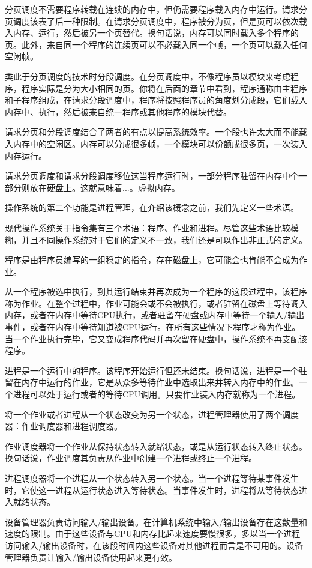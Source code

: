 分页调度不需要程序转载在连续的内存中，但仍需要程序载入内存中运行。请求分页调度该表了后一种限制。在请求分页调度中，程序被分为页，但是页可以依次载入内存、运行，然后被另一个页替代。换句话说，内存可以同时载入多个程序的页。此外，来自同一个程序的连续页可以不必载入同一个帧，一个页可以载入任何空闲帧。

类此于分页调度的技术时分段调度。在分页调度中，不像程序员以模块来考虑程序，程序实际是分为大小相同的页。你将在后面的章节中看到，程序通称由主程序和子程序组成，在请求分段调度中，程序将按照程序员的角度划分成段，它们载入内存中、执行，然后被来自统一程序或其他程序的模块代替。

请求分页和分段调度结合了两者的有点以提高系统效率。一个段也许太大而不能载入内存中的空闲区。内存可以分成很多帧，一个模块可以份额成很多页，一次装入内存运行。

请求分页调度和请求分段调度移位这当程序运行时，一部分程序驻留在内存中个一部分则放在硬盘上。这就意味着...。虚拟内存。

操作系统的第二个功能是进程管理，在介绍该概念之前，我们先定义一些术语。

现代操作系统关于指令集有三个术语：程序、作业和进程。尽管这些术语比较模糊，并且不同操作系统对于它们的定义不一致，我们还是可以作出非正式的定义。

程序是由程序员编写的一组稳定的指令，存在磁盘上，它可能会也肯能不会成为作业。

从一个程序被选中执行，到其运行结束并再次成为一个程序的这段过程中，该程序称为作业。在整个过程中，作业可能会或不会被执行，或者驻留在磁盘上等待调入内存，或者在内存中等待CPU执行，或者驻留在硬盘或内存中等待一个输入/输出事件，或者在内存中等待知道被CPU运行。在所有这些情况下程序才称为作业。当一个作业执行完毕，它又变成程序代码并再次留在硬盘中，操作系统不再支配该程序。

进程是一个运行中的程序。该程序开始运行但还未结束。换句话说，进程是一个驻留在内存中运行的作业，它是从众多等待作业中选取出来并转入内存中的作业。一个进程可以处于运行或者的等待CPU调用。只要作业装入内存就称为一个进程。

将一个作业或者进程从一个状态改变为另一个状态，进程管理器使用了两个调度器：作业调度器和进程调度器。

作业调度器将一个作业从保持状态转入就绪状态，或是从运行状态转入终止状态。换句话说，作业调度其负责从作业中创建一个进程或终止一个进程。

进程调度器将一个进程从一个状态转入另一个状态。当一个进程等待某事件发生时，它使这一进程从运行状态进入等待状态。当事件发生时，进程将从等待状态进入就绪状态。

设备管理器负责访问输入/输出设备。在计算机系统中输入/输出设备存在这数量和速度的限制。由于这些设备与CPU和内存比起来速度要慢很多，多以当一个进程访问输入/输出设备时，在该段时间内这些设备对其他进程而言是不可用的。设备管理器负责让输入/输出设备使用起来更有效。

